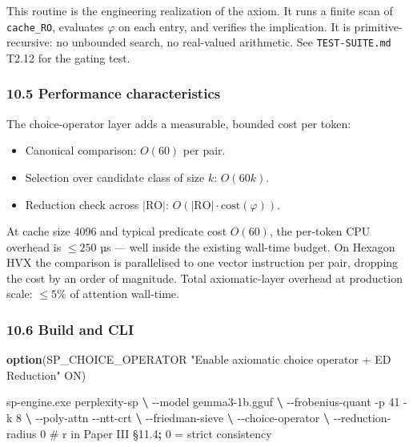 \documentclass[
  11pt,
]{article}
\newenvironment{Shaded}{}{}
\newcommand{\ExtensionTok}[1]{#1}
\newcommand{\KeywordTok}[1]{\textcolor[rgb]{0.00,0.44,0.13}{\textbf{#1}}}
\newcommand{\NormalTok}[1]{#1}
\newcommand{\StringTok}[1]{\textcolor[rgb]{0.25,0.44,0.63}{#1}}
\providecommand{\tightlist}{%
  \setlength{\itemsep}{0pt}\setlength{\parskip}{0pt}}
\begin{document}
This routine is the engineering realization of the axiom. It runs a
finite scan of \texttt{cache\_RO}, evaluates \(\varphi\) on each entry,
and verifies the implication. It is primitive-recursive: no unbounded
search, no real-valued arithmetic. See \texttt{TEST-SUITE.md} T2.12 for
the gating test.

\hypertarget{performance-characteristics}{%
\subsubsection{10.5 Performance
characteristics}\label{performance-characteristics}}

The choice-operator layer adds a measurable, bounded cost per token:

\begin{itemize}
\tightlist
\item
  Canonical comparison: \(O(60)\) per pair.
\item
  Selection over candidate class of size \(k\): \(O(60 k)\).
\item
  Reduction check across \(|\mathrm{RO}|\):
  \(O(|\mathrm{RO}| \cdot \mathrm{cost}(\varphi))\).
\end{itemize}

At cache size 4096 and typical predicate cost \(O(60)\), the per-token
CPU overhead is \(\le 250\) µs --- well inside the existing wall-time
budget. On Hexagon HVX the comparison is parallelised to one vector
instruction per pair, dropping the cost by an order of magnitude. Total
axiomatic-layer overhead at production scale: \(\le 5\%\) of attention
wall-time.

\hypertarget{build-and-cli}{%
\subsubsection{10.6 Build and CLI}\label{build-and-cli}}

\begin{Shaded}
\begin{Highlighting}[]
\KeywordTok{option}\NormalTok{(SP\_CHOICE\_OPERATOR }\StringTok{"Enable axiomatic choice operator + ED Reduction"}\NormalTok{ ON)}
\end{Highlighting}
\end{Shaded}

\begin{Shaded}
\begin{Highlighting}[]
\ExtensionTok{sp{-}engine.exe}\NormalTok{ perplexity{-}sp }\KeywordTok{\textbackslash{}}
    \ExtensionTok{{-}{-}model}\NormalTok{ gemma3{-}1b.gguf }\KeywordTok{\textbackslash{}}
    \ExtensionTok{{-}{-}frobenius{-}quant}\NormalTok{ {-}p 41 {-}k 8 }\KeywordTok{\textbackslash{}}
    \ExtensionTok{{-}{-}poly{-}attn}\NormalTok{ {-}{-}ntt{-}crt }\KeywordTok{\textbackslash{}}
    \ExtensionTok{{-}{-}friedman{-}sieve} \KeywordTok{\textbackslash{}}
    \ExtensionTok{{-}{-}choice{-}operator} \KeywordTok{\textbackslash{}}
    \ExtensionTok{{-}{-}reduction{-}radius}\NormalTok{ 0   \# r in Paper III §11.4}\KeywordTok{;} \ExtensionTok{0}\NormalTok{ = strict consistency}
\end{Highlighting}
\end{Shaded}
\end{document}
